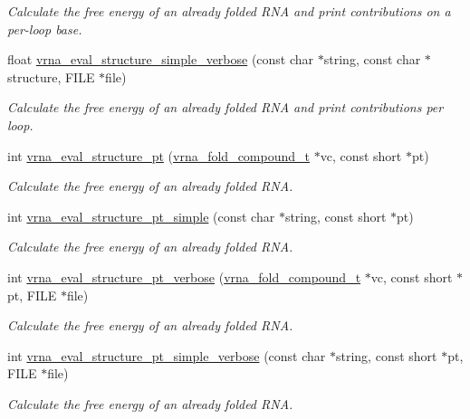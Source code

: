 \begin{DoxyCompactItemize}
\begin{DoxyCompactList}\small\item\em Calculate the free energy of an already folded R\-N\-A and print contributions on a per-\/loop base. \end{DoxyCompactList}\item 
float \hyperlink{group__eval_ga4c2895a7dcd756ef2dc7f76db7c4c53e}{vrna\-\_\-eval\-\_\-structure\-\_\-simple\-\_\-verbose} (const char $\ast$string, const char $\ast$structure, F\-I\-L\-E $\ast$file)
\begin{DoxyCompactList}\small\item\em Calculate the free energy of an already folded R\-N\-A and print contributions per loop. \end{DoxyCompactList}\item 
int \hyperlink{group__eval_gadbd09372ddfd7a450bbd590c96a6bfe4}{vrna\-\_\-eval\-\_\-structure\-\_\-pt} (\hyperlink{group__fold__compound_ga1b0cef17fd40466cef5968eaeeff6166}{vrna\-\_\-fold\-\_\-compound\-\_\-t} $\ast$vc, const short $\ast$pt)
\begin{DoxyCompactList}\small\item\em Calculate the free energy of an already folded R\-N\-A. \end{DoxyCompactList}\item 
int \hyperlink{group__eval_ga0bba59b4d6e53461088666ff4aece7b0}{vrna\-\_\-eval\-\_\-structure\-\_\-pt\-\_\-simple} (const char $\ast$string, const short $\ast$pt)
\begin{DoxyCompactList}\small\item\em Calculate the free energy of an already folded R\-N\-A. \end{DoxyCompactList}\item 
int \hyperlink{group__eval_ga8a517cfeeae8c376ae7b1e0c401d38b4}{vrna\-\_\-eval\-\_\-structure\-\_\-pt\-\_\-verbose} (\hyperlink{group__fold__compound_ga1b0cef17fd40466cef5968eaeeff6166}{vrna\-\_\-fold\-\_\-compound\-\_\-t} $\ast$vc, const short $\ast$pt, F\-I\-L\-E $\ast$file)
\begin{DoxyCompactList}\small\item\em Calculate the free energy of an already folded R\-N\-A. \end{DoxyCompactList}\item 
int \hyperlink{group__eval_ga76e152ee9a02be23da14cdddf52b4e44}{vrna\-\_\-eval\-\_\-structure\-\_\-pt\-\_\-simple\-\_\-verbose} (const char $\ast$string, const short $\ast$pt, F\-I\-L\-E $\ast$file)
\begin{DoxyCompactList}\small\item\em Calculate the free energy of an already folded R\-N\-A. \end{DoxyCompactList}\item 

\end{DoxyCompactItemize}
